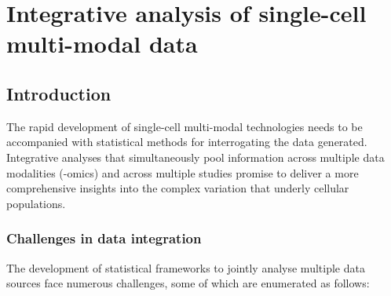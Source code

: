 \chapter{Integrative analysis of single-cell multi-modal data}

\section{Introduction}


The rapid development of single-cell multi-modal technologies needs to be accompanied with statistical methods for interrogating the data generated. Integrative analyses that simultaneously pool information across multiple data modalities (-omics) and across multiple studies promise to deliver a more comprehensive insights into the complex variation that underly cellular populations.\\

\subsection{Challenges in data integration}
The development of statistical frameworks to jointly analyse multiple data sources face numerous challenges, some of which are enumerated as follows:

